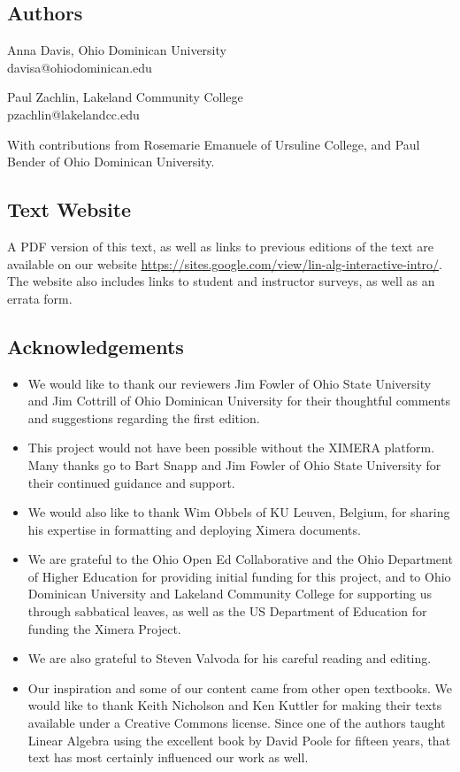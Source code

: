 \documentclass{ximera}
\begin{document}
\subsection{Authors}
Anna Davis, Ohio Dominican University\\
davisa@ohiodominican.edu

Paul Zachlin, Lakeland Community College\\
pzachlin@lakelandcc.edu

With contributions from Rosemarie Emanuele of Ursuline College, and Paul Bender of Ohio Dominican University.

\subsection{Text Website}
A PDF version of this text, as well as links to previous editions of the text are available on our website \href{https://sites.google.com/view/lin-alg-interactive-intro/}{https://sites.google.com/view/lin-alg-interactive-intro/}.  The website also includes links to student and instructor surveys, as well as an errata form.

\subsection{Acknowledgements}
\begin{itemize}
\item
We would like to thank our reviewers Jim Fowler of Ohio State University and Jim Cottrill of Ohio Dominican University for their thoughtful comments and suggestions regarding the first edition.  
\item This project would not have been possible without the XIMERA platform.  Many thanks go to Bart Snapp and Jim Fowler of Ohio State University for their continued guidance and support.   
\item We would also like to thank Wim Obbels of KU Leuven, Belgium, for sharing his expertise in formatting and deploying Ximera documents.
\item We are grateful to the Ohio Open Ed Collaborative and the Ohio Department of Higher Education for providing initial funding for this project, and to Ohio Dominican University and Lakeland Community College for supporting us through sabbatical leaves, as well as the US Department of Education for funding the Ximera Project.
\item We are also grateful to Steven Valvoda for his careful reading and editing.
\item Our inspiration and some of our content came from other open textbooks. We would like to thank Keith Nicholson and Ken Kuttler for making their texts available under a Creative Commons license.  Since one of the authors taught Linear Algebra using the excellent book by David Poole for fifteen years, that text has most certainly influenced our work as well.
\end{itemize}
\end{document}
